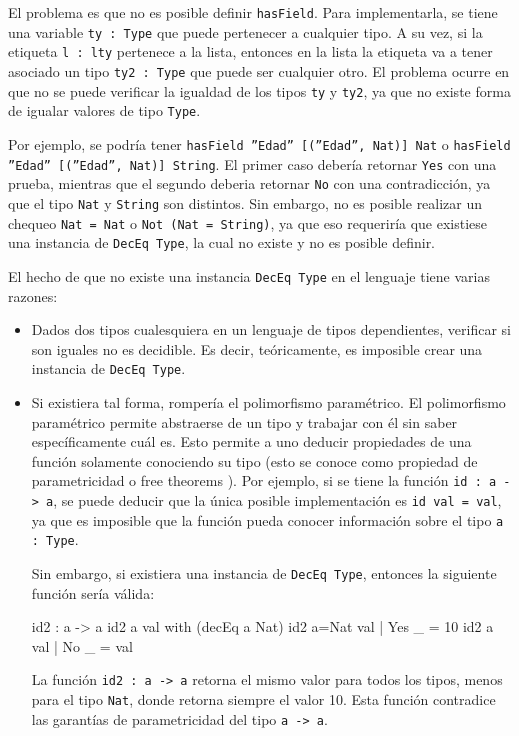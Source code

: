 El problema es que no es posible definir \texttt{hasField}. Para implementarla, se tiene una variable \texttt{ty : Type} que puede pertenecer a cualquier tipo. A su vez, si la etiqueta \texttt{l : lty} pertenece a la lista, entonces en la lista la etiqueta va a tener asociado un tipo \texttt{ty2 : Type} que puede ser cualquier otro. El problema ocurre en que no se puede verificar la igualdad de los tipos \texttt{ty} y \texttt{ty2}, ya que no existe forma de igualar valores de tipo \texttt{Type}.

Por ejemplo, se podría tener \texttt{hasField ''Edad'' [(''Edad'', Nat)] Nat} o \texttt{hasField ''Edad'' [(''Edad'', Nat)] String}. El primer caso debería retornar \texttt{Yes} con una prueba, mientras que el segundo deberia retornar \texttt{No} con una contradicción, ya que el tipo \texttt{Nat} y \texttt{String} son distintos. Sin embargo, no es posible realizar un chequeo \texttt{Nat = Nat} o \texttt{Not (Nat = String)}, ya que eso requeriría que existiese una instancia de \texttt{DecEq Type}, la cual no existe y no es posible definir.

El hecho de que no existe una instancia \texttt{DecEq Type} en el lenguaje tiene varias razones:

\begin{itemize}
\item Dados dos tipos cualesquiera en un lenguaje de tipos dependientes, verificar si son iguales no es decidible. Es decir, teóricamente, es imposible crear una instancia de \texttt{DecEq Type}.
\item Si existiera tal forma, rompería el polimorfismo paramétrico. El polimorfismo paramétrico permite abstraerse de un tipo y trabajar con él sin saber específicamente cuál es. Esto permite a uno deducir propiedades de una función solamente conociendo su tipo (esto se conoce como propiedad de parametricidad o free theorems \cite{Wadler:1989:TF:99370.99404}). Por ejemplo, si se tiene la función \texttt{id : a -> a}, se puede deducir que la única posible implementación es \texttt{id val = val}, ya que es imposible que la función pueda conocer información sobre el tipo \texttt{a : Type}.

Sin embargo, si existiera una instancia de \texttt{DecEq Type}, entonces la siguiente función sería válida:

\begin{code}
id2 : a -> a
id2 {a} val with (decEq a Nat)
  id2 {a=Nat} val | Yes _ = 10
  id2 {a} val | No _ = val
\end{code}

La función \texttt{id2 : a -> a} retorna el mismo valor para todos los tipos, menos para el tipo \texttt{Nat}, donde retorna siempre el valor 10. Esta función contradice las garantías de parametricidad del tipo \texttt{a -> a}.
\end{itemize}

